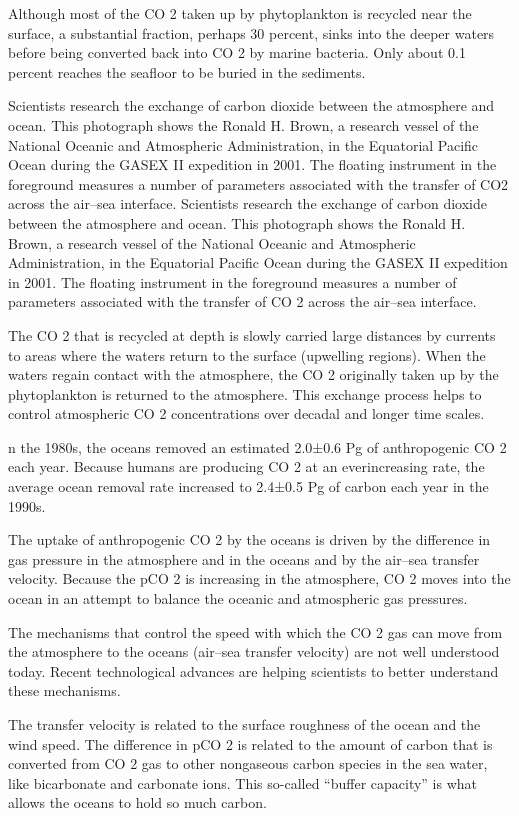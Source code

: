\documentclass[
]{book}
\begin{document}
Although most of the CO 2 taken up by phytoplankton is recycled near the surface, a substantial fraction, perhaps 30 percent, sinks into the deeper waters before being converted back into CO 2 by marine bacteria. Only about 0.1 percent reaches the seafloor to be buried in the sediments.

Scientists research the exchange of carbon dioxide between the atmosphere and ocean. This photograph shows the Ronald H. Brown, a research vessel of the National Oceanic and Atmospheric Administration, in the Equatorial Pacific Ocean during the GASEX II expedition in 2001. The floating instrument in the foreground measures a number of parameters associated with the transfer of CO2 across the air--sea interface.
Scientists research the exchange of carbon dioxide between the atmosphere and ocean. This photograph shows the Ronald H. Brown, a research vessel of the National Oceanic and Atmospheric Administration, in the Equatorial Pacific Ocean during the GASEX II expedition in 2001. The floating instrument in the foreground measures a number of parameters associated with the transfer of CO 2 across the air--sea interface.

The CO 2 that is recycled at depth is slowly carried large distances by currents to areas where the waters return to the surface (upwelling regions). When the waters regain contact with the atmosphere, the CO 2 originally taken up by the phytoplankton is returned to the atmosphere. This exchange process helps to control atmospheric CO 2 concentrations over decadal and longer time scales.

n the 1980s, the oceans removed an estimated 2.0±0.6 Pg of anthropogenic CO 2 each year. Because humans are producing CO 2 at an everincreasing rate, the average ocean removal rate increased to 2.4±0.5 Pg of carbon each year in the 1990s.

The uptake of anthropogenic CO 2 by the oceans is driven by the difference in gas pressure in the atmosphere and in the oceans and by the air--sea transfer velocity. Because the pCO 2 is increasing in the atmosphere, CO 2 moves into the ocean in an attempt to balance the oceanic and atmospheric gas pressures.

The mechanisms that control the speed with which the CO 2 gas can move from the atmosphere to the oceans (air--sea transfer velocity) are not well understood today. Recent technological advances are helping scientists to better understand these mechanisms.

The transfer velocity is related to the surface roughness of the ocean and the wind speed. The difference in pCO 2 is related to the amount of carbon that is converted from CO 2 gas to other nongaseous carbon species in the sea water, like bicarbonate and carbonate ions. This so-called ``buffer capacity'' is what allows the oceans to hold so much carbon.
\end{document}

